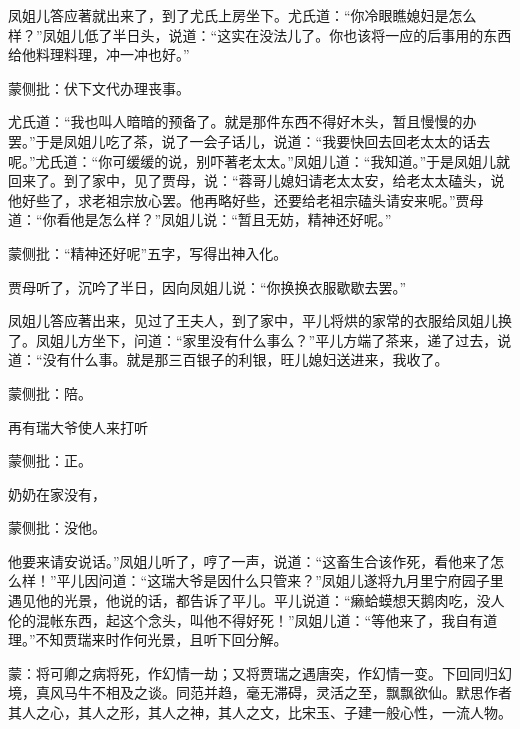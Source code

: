 \begin{parag}


    凤姐儿答应著就出来了，到了尤氏上房坐下。尤氏道：“你冷眼瞧媳妇是怎么样？”凤姐儿低了半日头，说道：“这实在没法儿了。你也该将一应的后事用的东西给他料理料理，冲一冲也好。”\begin{note}蒙侧批：伏下文代办理丧事。\end{note}尤氏道：“我也叫人暗暗的预备了。就是那件东西不得好木头，暂且慢慢的办罢。”于是凤姐儿吃了茶，说了一会子话儿，说道：“我要快回去回老太太的话去呢。”尤氏道：“你可缓缓的说，别吓著老太太。”凤姐儿道：“我知道。”于是凤姐儿就回来了。到了家中，见了贾母，说：“蓉哥儿媳妇请老太太安，给老太太磕头，说他好些了，求老祖宗放心罢。他再略好些，还要给老祖宗磕头请安来呢。”贾母道：“你看他是怎么样？”凤姐儿说：“暂且无妨，精神还好呢。”\begin{note}蒙侧批：“精神还好呢”五字，写得出神入化。\end{note}贾母听了，沉吟了半日，因向凤姐儿说：“你换换衣服歇歇去罢。”
\end{parag}


\begin{parag}


    凤姐儿答应著出来，见过了王夫人，到了家中，平儿将烘的家常的衣服给凤姐儿换了。凤姐儿方坐下，问道：“家里没有什么事么？”平儿方端了茶来，递了过去，说道：“没有什么事。就是那三百银子的利银，旺儿媳妇送进来，我收了。\begin{note}蒙侧批：陪。\end{note}再有瑞大爷使人来打听\begin{note}蒙侧批：正。\end{note}奶奶在家没有，\begin{note}蒙侧批：没他。\end{note}他要来请安说话。”凤姐儿听了，哼了一声，说道：“这畜生合该作死，看他来了怎么样！”平儿因问道：“这瑞大爷是因什么只管来？”凤姐儿遂将九月里宁府园子里遇见他的光景，他说的话，都告诉了平儿。平儿说道：“癞蛤蟆想天鹅肉吃，没人伦的混帐东西，起这个念头，叫他不得好死！”凤姐儿道：“等他来了，我自有道理。”不知贾瑞来时作何光景，且听下回分解。
\end{parag}


\begin{parag}


    \begin{note}蒙：将可卿之病将死，作幻情一劫；又将贾瑞之遇唐突，作幻情一变。下回同归幻境，真风马牛不相及之谈。同范并趋，毫无滞碍，灵活之至，飘飘欲仙。默思作者其人之心，其人之形，其人之神，其人之文，比宋玉、子建一般心性，一流人物。\end{note}
\end{parag}
